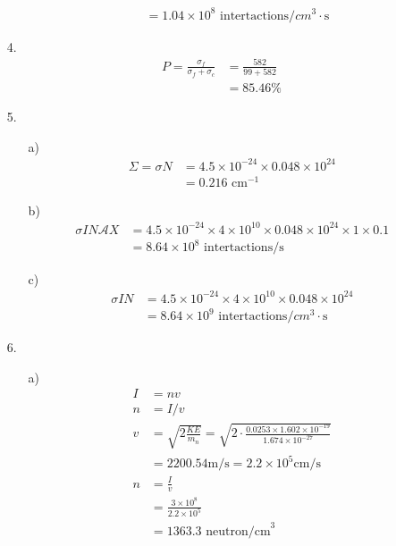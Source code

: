 \documentclass{article}
\begin{document}
\begin{itemize}
\begin{itemize}
\begin{align*}
            &=1.04\times 10^8 \text{ intertactions/\(cm^3\cdot\)s}
        \end{align*}
    \end{itemize}
    \item [4.]
    \begin{align*}
        P = \frac{\sigma_f}{\sigma_f+\sigma_c}&=\frac{582}{99+582}\\ &=85.46\%
    \end{align*}
    \item [5.]
    \begin{itemize}
        \item [a)]
        \begin{align*}
            \Sigma = \sigma N &= 4.5\times 10^{-24}\times 0.048\times 10^{24}\\
            &=0.216 \text{ cm}^{-1}
        \end{align*}
        \item [b)]
        \begin{align*}
            \sigma I N \mathcal{A} X &=4.5\times 10^{-24}\times4\times 10^{10}\times 0.048\times 10^{24}\times 1\times 0.1\\
            &=8.64\times 10^8\text{ intertactions/s}
        \end{align*}
        \item [c)]
        \begin{align*}
            \sigma I N &= 4.5\times 10^{-24}\times4\times 10^{10}\times 0.048\times 10^{24}\\
            &=8.64\times 10^9\text{ intertactions/\(cm^3\cdot\)s}
        \end{align*}
    \end{itemize}
    \item [6.]
    \begin{itemize}
        \item [a)]
        \begin{align*}
            I&=nv\\
            n&=I/v\\
            v&=\sqrt{2\frac{KE}{m_n}}=\sqrt{2\cdot\frac{0.0253\times 1.602\times 10^{-19}}{1.674\times  10^{-27}}}\\
            &=2200.54 \text{m/s} = 2.2\times 10^5 \text{cm/s}\\
            n &= \frac{I}{v}\\
            &=\frac{3\times 10^{8}}{2.2\times 10^5}\\
            &=1363.3 \text{ neutron/cm}^3
        \end{align*}

\end{itemize}
\end{itemize}
\end{document}
